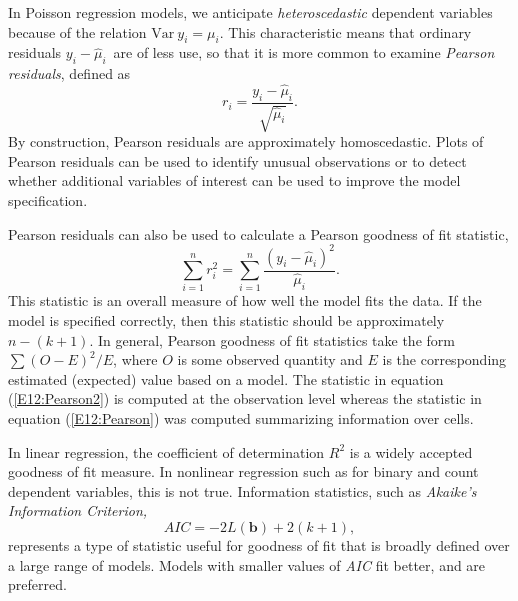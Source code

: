 In Poisson regression models, we anticipate \emph{heteroscedastic}
dependent variables because of the relation $\mathrm{Var~}y_i=\mu
_i$. This characteristic means that ordinary residuals
$y_i-\widehat{\mu }_i$\ are of less use, so that it is more common
to examine \emph{Pearson residuals}, defined as
\begin{equation*}
r_i=\frac{y_i-\widehat{\mu }_i}{\sqrt{\widehat{\mu }_i}}.
\end{equation*}
By construction, Pearson residuals are approximately homoscedastic.
Plots of Pearson residuals can be used to identify unusual
observations or to detect whether additional variables of interest
can be used to improve the model specification.


Pearson residuals can also be used to calculate a Pearson goodness of fit
statistic,
\begin{equation}\label{E12:Pearson2}
\sum\limits_{i=1}^{n}r_i^2=\sum\limits_{i=1}^{n}\frac{\left( y_i-%
\widehat{\mu }_i\right)^2}{\widehat{\mu }_i}.
\end{equation}
This statistic is an overall measure of how well the model fits the
data. If the model is specified correctly, then this statistic
should be approximately $n-(k+1)$. In general, Pearson goodness of
fit statistics take the form $\sum \left( O-E\right)^2/E$, where $O$
is some observed quantity and $E$ is the corresponding estimated
(expected) value based on a model. The statistic in equation
(\ref{E12:Pearson2}) is computed at the observation level whereas
the statistic in equation (\ref{E12:Pearson}) was computed
summarizing information over cells.

In linear regression, the coefficient of determination $R^2$ is a
widely accepted goodness of fit measure. In nonlinear regression
such as for binary and count dependent variables, this is not true.
Information statistics, such as \emph{Akaike's Information
Criterion,}
\begin{equation*}
AIC=-2 L(\mathbf{b}) +2(k+1),
\end{equation*}
represents a type of statistic useful for goodness of fit that is
broadly defined over a large range of models. Models with smaller
values of \textit{AIC} fit better, and are preferred.


